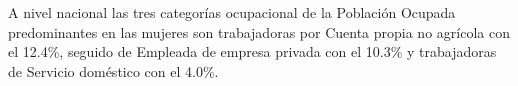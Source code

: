  A nivel nacional las tres categorías ocupacional de la Población Ocupada predominantes en las mujeres son trabajadoras por Cuenta propia no agrícola con el 12.4\%, seguido de Empleada de empresa privada con el 10.3\% y trabajadoras de Servicio doméstico con el 4.0\%.
